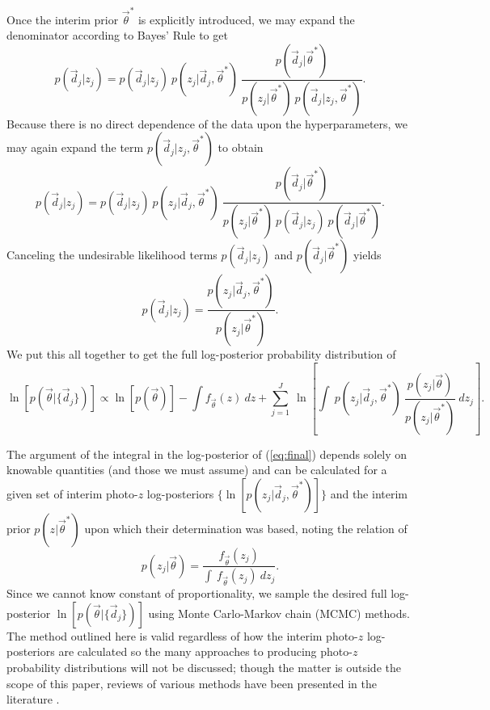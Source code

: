 \documentclass[preprint]{aastex}
\begin{document}
Once the interim prior $\vec{\theta}^{*}$ is explicitly introduced, we may 
expand the denominator according to Bayes' Rule to get 
\begin{equation}
\label{eq:expand}
p(\vec{d}_{j}|z_{j}) = p(\vec{d}_{j}|z_{j})\ 
p(z_{j}|\vec{d}_{j},\vec{\theta}^{*})\ 
\frac{p(\vec{d}_{j}|\vec{\theta}^{*})}{p(z_{j}|\vec{\theta}^{*})\ 
p(\vec{d}_{j}|z_{j},\vec{\theta}^{*})}.
\end{equation}
Because there is no direct dependence of the data upon the hyperparameters, we 
may again expand the term $p(\vec{d}_{j}|z_{j},\vec{\theta}^{*})$ to obtain 
\begin{equation}
\label{eq:indterm}
p(\vec{d}_{j}|z_{j}) = p(\vec{d}_{j}|z_{j})\ 
p(z_{j}|\vec{d}_{j},\vec{\theta}^{*})\ 
\frac{p(\vec{d}_{j}|\vec{\theta}^{*})}{p(z_{j}|\vec{\theta}^{*})\ 
p(\vec{d}_{j}|z_{j})\ p(\vec{d}_{j}|\vec{\theta}^{*})}.
\end{equation}
Canceling the undesirable likelihood terms $p(\vec{d}_{j}|z_{j})$ and 
$p(\vec{d}_{j}|\vec{\theta}^{*})$ yields
\begin{equation}
\label{eq:cancel}
p(\vec{d}_{j}|z_{j}) = 
\frac{p(z_{j}|\vec{d}_{j},\vec{\theta}^{*})}{p(z_{j}|\vec{\theta}^{*})}.
\end{equation}
We put this all together to get the full log-posterior probability distribution 
of 
\begin{equation}
\label{eq:final}
\ln[p(\vec{\theta}|\{\vec{d}_{j}\})] \propto \ln[p(\vec{\theta})]-\int 
f_{\vec{\theta}}(z)\ dz + \sum_{j=1}^{J}\ \ln\left[\int\ 
p(z_{j}|\vec{d}_{j},\vec{\theta}^{*})\ 
\frac{p(z_{j}|\vec{\theta})}{p(z_{j}|\vec{\theta}^{*})}\ dz_{j}\right].
\end{equation}

The argument of the integral in the log-posterior of (\ref{eq:final}) depends 
solely on knowable quantities (and those we must assume) and can be calculated 
for a given set of interim photo-$z$ log-posteriors 
$\{\ln[p(z_{j}|\vec{d}_{j},\vec{\theta}^{*})]\}$ and the interim prior 
$p(z|\vec{\theta}^{*})$ upon which their determination was based, noting the 
relation of 
\begin{equation}
\label{eq:params}
p(z_{j}|\vec{\theta}) = \frac{f_{\vec{\theta}}(z_{j})}{\int\ 
f_{\vec{\theta}}(z_{j})\ dz_{j}}.
\end{equation}
Since we cannot know constant of proportionality, we sample the desired full 
log-posterior $\ln[p(\vec{\theta}|\{\vec{d}_{j}\})]$ using Monte Carlo-Markov 
chain (MCMC) methods.  The method outlined here is valid regardless of how the 
interim photo-$z$ log-posteriors are calculated so the many approaches to 
producing photo-$z$ probability distributions will not be discussed; though the 
matter is outside the scope of this paper, reviews of various methods have been 
presented in the literature \citep{Sheldon2012, Ball2008, CarrascoKind2013, 
CarrascoKind2014a}.
\end{document}
